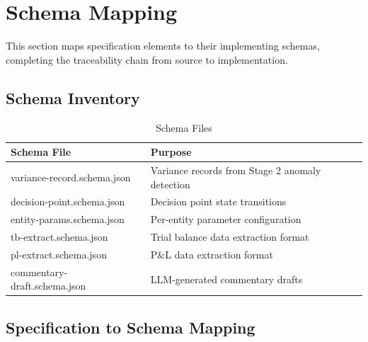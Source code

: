 \documentclass[11pt,a4paper]{article}
\begin{document}

\newpage
\section{Schema Mapping}

This section maps specification elements to their implementing schemas, 
completing the traceability chain from source to implementation.

\subsection{Schema Inventory}

\begin{table}[h]
\centering
\caption{Schema Files}
\begin{tabular}{@{}L{5cm}L{9cm}@{}}
\toprule
\textbf{Schema File} & \textbf{Purpose} \\
\midrule
variance-record.schema.json & Variance records from Stage 2 anomaly detection \\
decision-point.schema.json & Decision point state transitions \\
entity-params.schema.json & Per-entity parameter configuration \\
tb-extract.schema.json & Trial balance data extraction format \\
pl-extract.schema.json & P\&L data extraction format \\
commentary-draft.schema.json & LLM-generated commentary drafts \\
\bottomrule
\end{tabular}
\end{table}

\subsection{Specification to Schema Mapping}
\end{document}
